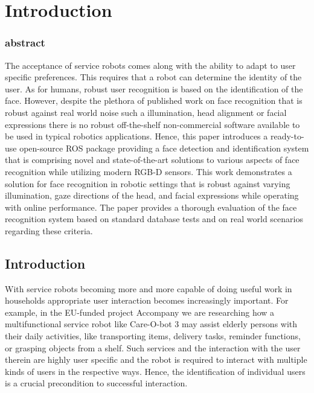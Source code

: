 \chapter{Introduction}
\subsection{abstract}
The acceptance of service robots comes along with the ability to adapt to user specific preferences. This requires that a robot can determine the identity of the user. As for humans, robust user recognition is based on the identification of the face. However, despite the plethora of published work on face recognition that is robust against real world noise such a illumination, head alignment or facial expressions there is no robust off-the-shelf non-commercial software available to be used in typical robotics applications. Hence, this paper introduces a ready-to-use open-source ROS package providing a face detection and identification system that is comprising novel and state-of-the-art solutions to various aspects of face recognition while utilizing modern RGB-D sensors. This work demonstrates a solution for face recognition in robotic settings that is robust against varying illumination, gaze directions of the head, and facial expressions while operating with online performance. The paper provides a thorough evaluation of the face recognition system based on standard database tests and on real world scenarios regarding these criteria.


\section{Introduction}

With service robots becoming more and more capable of doing useful work in households appropriate user interaction becomes increasingly important. For example, in the EU-funded project Accompany we are researching how a multifunctional service robot like Care-O-bot 3 may assist elderly persons with their daily activities, like transporting items, delivery tasks, reminder functions, or grasping objects from a shelf. Such services and the interaction with the user therein are highly user specific and the robot is required to interact with multiple kinds of users in the respective ways. Hence, the identification of individual users is a crucial precondition to successful interaction.

